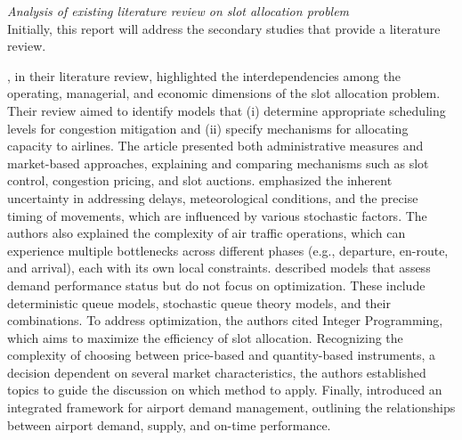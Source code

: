 \textit{Analysis of existing literature review on slot allocation problem}
\\

Initially, this report will address the secondary studies that provide a literature review.

, in their literature review, highlighted the interdependencies among the operating, managerial, and economic dimensions of the slot allocation problem. Their review aimed to identify models that (i) determine appropriate scheduling levels for congestion mitigation and (ii) specify mechanisms for allocating capacity to airlines. The article presented both administrative measures and market-based approaches, explaining and comparing mechanisms such as slot control, congestion pricing, and slot auctions.  emphasized the inherent uncertainty in addressing delays, meteorological conditions, and the precise timing of movements, which are influenced by various stochastic factors. The authors also explained the complexity of air traffic operations, which can experience multiple bottlenecks across different phases (e.g., departure, en-route, and arrival), each with its own local constraints.  described models that assess demand performance status but do not focus on optimization. These include deterministic queue models, stochastic queue theory models, and their combinations. To address optimization, the authors cited Integer Programming, which aims to maximize the efficiency of slot allocation. Recognizing the complexity of choosing between price-based and quantity-based instruments, a decision dependent on several market characteristics, the authors established topics to guide the discussion on which method to apply. Finally,  introduced an integrated framework for airport demand management, outlining the relationships between airport demand, supply, and on-time performance.

